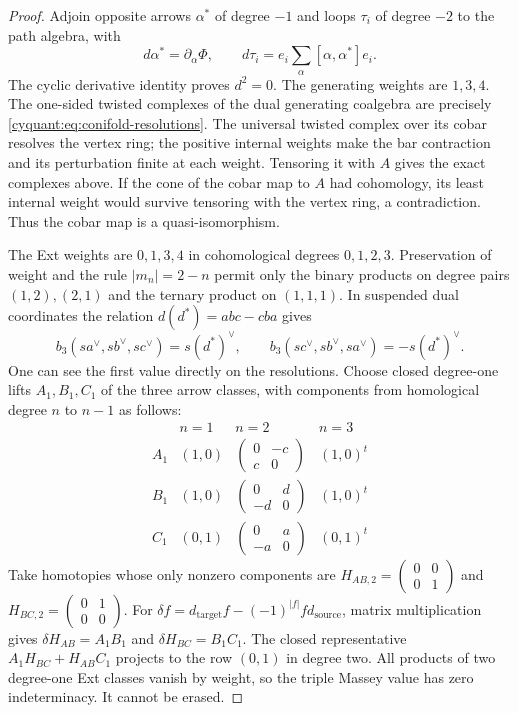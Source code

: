 \begin{proof}
Adjoin opposite arrows $\alpha^*$ of degree $-1$ and loops $\tau_i$
of degree $-2$ to the path algebra, with
\[
 d\alpha^*=\partial_\alpha\Phi,\qquad
 d\tau_i=e_i\sum_\alpha[\alpha,\alpha^*]e_i.
\]
The cyclic derivative identity proves $d^2=0$.  The generating weights
are $1,3,4$.  The one-sided twisted complexes of the dual generating
coalgebra are precisely \eqref{cyquant:eq:conifold-resolutions}.
The universal twisted complex over its cobar resolves the vertex ring;
the positive internal weights make the bar contraction and its
perturbation finite at each weight.  Tensoring it with $A$ gives the
exact complexes above.  If the cone of the cobar map to $A$ had
cohomology, its least internal weight would survive tensoring with the
vertex ring, a contradiction.  Thus the cobar map is a quasi-isomorphism.

The Ext weights are $0,1,3,4$ in cohomological degrees $0,1,2,3$.
Preservation of weight and the rule $|m_n|=2-n$ permit only the
binary products on degree pairs $(1,2),(2,1)$ and the ternary product
on $(1,1,1)$.  In suspended dual coordinates the relation
$d(d^*)=abc-cba$ gives
\[
 b_3(sa^\vee,sb^\vee,sc^\vee)=s(d^*)^\vee,
 \qquad
 b_3(sc^\vee,sb^\vee,sa^\vee)=-s(d^*)^\vee.
\]
One can see the first value directly on the resolutions.  Choose closed
degree-one lifts $A_1,B_1,C_1$ of the three arrow classes, with components
from homological degree $n$ to $n-1$ as follows:
\[
 \begin{array}{c|ccc}
 &n=1&n=2&n=3\\\hline
 A_1&(1,0)&\left(\begin{smallmatrix}0&-c\\c&0\end{smallmatrix}\right)&(1,0)^t\\
 B_1&(1,0)&\left(\begin{smallmatrix}0&d\\-d&0\end{smallmatrix}\right)&(1,0)^t\\
 C_1&(0,1)&\left(\begin{smallmatrix}0&a\\-a&0\end{smallmatrix}\right)&(0,1)^t
 \end{array}
\]
Take homotopies whose only nonzero components are
$H_{AB,2}=\left(\begin{smallmatrix}0&0\\0&1\end{smallmatrix}\right)$
and $H_{BC,2}=\left(\begin{smallmatrix}0&1\\0&0\end{smallmatrix}\right)$.
For $\delta f=d_{\mathrm{target}}f-(-1)^{|f|}fd_{\mathrm{source}}$,
matrix multiplication gives $\delta H_{AB}=A_1B_1$ and
$\delta H_{BC}=B_1C_1$.  The closed representative
$A_1H_{BC}+H_{AB}C_1$ projects to the row $(0,1)$ in degree two.
All products of two degree-one Ext classes vanish by weight, so the
triple Massey value has zero indeterminacy.  It cannot be erased.
\end{proof}

